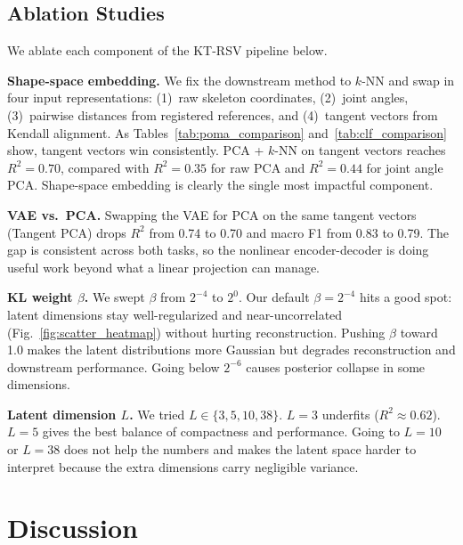 \documentclass{article}
\begin{document}
\subsection{Ablation Studies}
\label{sec:ablation}

We ablate each component of the KT-RSV pipeline below.

\textbf{Shape-space embedding.} We fix the downstream method to $k$-NN and swap in four input representations: (1)~raw skeleton coordinates, (2)~joint angles, (3)~pairwise distances from registered references, and (4)~tangent vectors from Kendall alignment. As Tables~\ref{tab:poma_comparison} and~\ref{tab:clf_comparison} show, tangent vectors win consistently. PCA + $k$-NN on tangent vectors reaches $R^2 = 0.70$, compared with $R^2 = 0.35$ for raw PCA and $R^2 = 0.44$ for joint angle PCA. Shape-space embedding is clearly the single most impactful component.

\textbf{VAE vs.\ PCA.} Swapping the VAE for PCA on the same tangent vectors (Tangent PCA) drops $R^2$ from 0.74 to 0.70 and macro F1 from 0.83 to 0.79. The gap is consistent across both tasks, so the nonlinear encoder-decoder is doing useful work beyond what a linear projection can manage.

\textbf{KL weight $\beta$.} We swept $\beta$ from $2^{-4}$ to $2^{0}$. Our default $\beta = 2^{-4}$ hits a good spot: latent dimensions stay well-regularized and near-uncorrelated (Fig.~\ref{fig:scatter_heatmap}) without hurting reconstruction. Pushing $\beta$ toward 1.0 makes the latent distributions more Gaussian but degrades reconstruction and downstream performance. Going below $2^{-6}$ causes posterior collapse in some dimensions.

\textbf{Latent dimension $L$.} We tried $L \in \{3, 5, 10, 38\}$. $L = 3$ underfits ($R^2 \approx 0.62$). $L = 5$ gives the best balance of compactness and performance. Going to $L = 10$ or $L = 38$ does not help the numbers and makes the latent space harder to interpret because the extra dimensions carry negligible variance.

\section{Discussion}
\label{sec:discussion}
\end{document}
